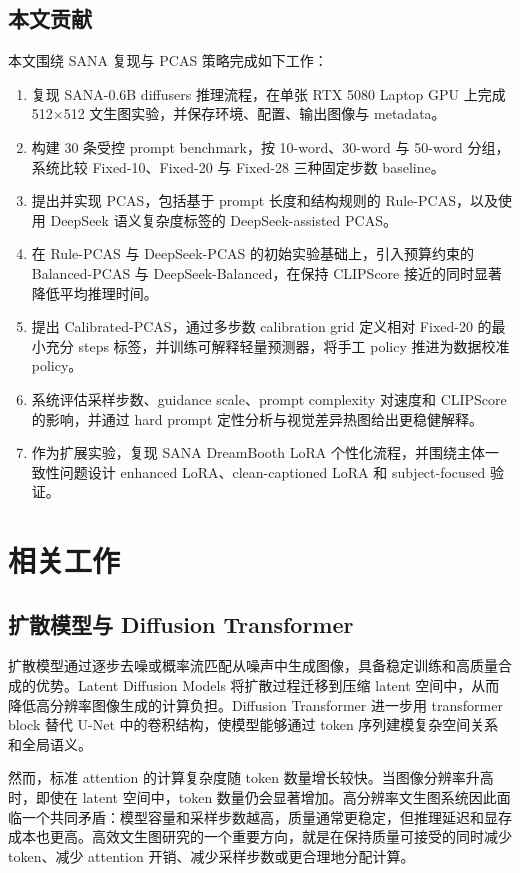 \documentclass[UTF8,zihao=-4,fontset=fandol]{ctexart}
\newcommand{\clipscore}{\textrm{CLIPScore}}
\begin{document}
\subsection{本文贡献}

本文围绕 SANA 复现与 PCAS 策略完成如下工作：
\begin{enumerate}
  \item 复现 SANA-0.6B diffusers 推理流程，在单张 RTX 5080 Laptop GPU 上完成 512$\times$512 文生图实验，并保存环境、配置、输出图像与 metadata。
  \item 构建 30 条受控 prompt benchmark，按 10-word、30-word 与 50-word 分组，系统比较 Fixed-10、Fixed-20 与 Fixed-28 三种固定步数 baseline。
  \item 提出并实现 PCAS，包括基于 prompt 长度和结构规则的 Rule-PCAS，以及使用 DeepSeek 语义复杂度标签的 DeepSeek-assisted PCAS。
  \item 在 Rule-PCAS 与 DeepSeek-PCAS 的初始实验基础上，引入预算约束的 Balanced-PCAS 与 DeepSeek-Balanced，在保持 \clipscore{} 接近的同时显著降低平均推理时间。
  \item 提出 Calibrated-PCAS，通过多步数 calibration grid 定义相对 Fixed-20 的最小充分 steps 标签，并训练可解释轻量预测器，将手工 policy 推进为数据校准 policy。
  \item 系统评估采样步数、guidance scale、prompt complexity 对速度和 \clipscore{} 的影响，并通过 hard prompt 定性分析与视觉差异热图给出更稳健解释。
  \item 作为扩展实验，复现 SANA DreamBooth LoRA 个性化流程，并围绕主体一致性问题设计 enhanced LoRA、clean-captioned LoRA 和 subject-focused 验证。
\end{enumerate}

\section{相关工作}

\subsection{扩散模型与 Diffusion Transformer}

扩散模型通过逐步去噪或概率流匹配从噪声中生成图像，具备稳定训练和高质量合成的优势。Latent Diffusion Models 将扩散过程迁移到压缩 latent 空间中，从而降低高分辨率图像生成的计算负担。Diffusion Transformer 进一步用 transformer block 替代 U-Net 中的卷积结构，使模型能够通过 token 序列建模复杂空间关系和全局语义。

然而，标准 attention 的计算复杂度随 token 数量增长较快。当图像分辨率升高时，即使在 latent 空间中，token 数量仍会显著增加。高分辨率文生图系统因此面临一个共同矛盾：模型容量和采样步数越高，质量通常更稳定，但推理延迟和显存成本也更高。高效文生图研究的一个重要方向，就是在保持质量可接受的同时减少 token、减少 attention 开销、减少采样步数或更合理地分配计算。
\end{document}
